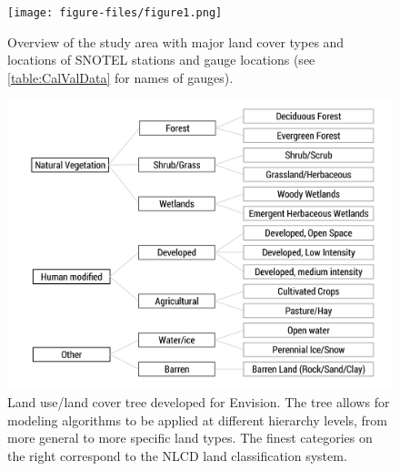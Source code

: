 \documentclass[water,article,submit,moreauthors,pdftex,10pt,a4paper]{mdpi}
\theoremstyle{mdpi}
\newcounter{thm}
\newcounter{ex}
\newcounter{re}
\theoremstyle{mdpidefinition}
\begin{document}

\renewcommand\bibname{References}










\clearpage

\begin{figure}
\centering
\texttt{[image: figure-files/figure1.png]}
\caption{Overview of the study area with major land cover types and locations of SNOTEL stations and gauge locations (see \cref{table:CalValData} for names of gauges).}
\label{fig:StudySite}
\end{figure}
\clearpage

\begin{figure}
\centering
\includegraphics[width=\textwidth]{figure-files/figure2.png}
\caption{Land use/land cover tree developed for Envision. The tree allows for modeling algorithms to be applied at different hierarchy levels, from more general to more specific land types. The finest categories on the right correspond to the NLCD land classification system.}
\label{fig:LULCtree}
\end{figure}
\clearpage
\end{document}
